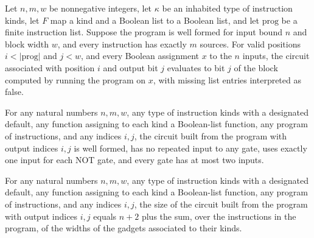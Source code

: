\begin{theorem}
\label{BoolCircuit.progCircuit_eval}
\leanok
{}
Let $n,m,w$ be nonnegative integers, let $\kappa$ be an inhabited type of instruction
kinds, let $F$ map a kind and a Boolean list to a Boolean list, and let $\mathrm{prog}$
be a finite instruction list. Suppose the program is well formed for input bound $n$ and
block width $w$, and every instruction has exactly $m$ sources. For valid positions
$i<|\mathrm{prog}|$ and $j<w$, and every Boolean assignment $x$ to the $n$ inputs, the
circuit associated with position $i$ and output bit $j$ evaluates to bit $j$ of the
block computed by running the program on $x$, with missing list entries interpreted as
false.
\end{theorem}

\begin{theorem}
\label{BoolCircuit.progCircuit_isFaninTwo}
\leanok
{}
For any natural numbers $n,m,w$, any type of instruction kinds with a designated
default, any function assigning to each kind a Boolean-list function, any program of
instructions, and any indices $i,j$, the circuit built from the program with output
indices $i,j$ is well formed, has no repeated input to any gate, uses exactly one input
for each NOT gate, and every gate has at most two inputs.
\end{theorem}

\begin{theorem}
\label{BoolCircuit.progCircuit_size}
\leanok
{}
For any natural numbers $n,m,w$, any type of instruction kinds with a designated
default, any function assigning to each kind a Boolean-list function, any program of
instructions, and any indices $i,j$, the size of the circuit built from the program with
output indices $i,j$ equals $n+2$ plus the sum, over the instructions in the program, of
the widths of the gadgets associated to their kinds.
\end{theorem}

